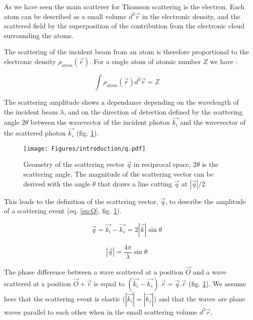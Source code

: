 As we have seen the main scatterer for Thomson scattering is the electron.
Each atom can be described as a small volume $d^3\vec{r}$ in the electronic density, and the scattered field by the superposition of the contribution from the electronic cloud surrounding the atoms.

The scattering of the incident beam from an atom is therefore proportional to the electronic density $\rho_{atom}(\vec{r})$.
For a single atom of atomic number $Z$ we have :

\begin{equation}
    \int \rho_{atom} (\vec{r}) d^3\vec{r} = Z
\end{equation}

The scattering amplitude shows a dependance depending on the wavelength of the incident beam $\lambda$, and on the direction of detection defined by the scattering angle $2\theta$ between the wavevector of the incident photon $\vec{k_i}$ and the wavevector of the scattered photon $\vec{k_s}$ (fig. \ref{fig:q}).

\begin{figure}[!htb]
    \centering
    \texttt{[image: Figures/introduction/q.pdf]}
    \caption{Geometry of the scattering vector $\vec{q}$ in reciprocal space, $2\theta$ is the scattering angle. The magnitude of the scattering vector can be derived with the angle $\theta$ that draws a line cutting $\vec{q}$ at $|\vec{q}|/2$.}
    \label{fig:q}
\end{figure}

This leads to the definition of the scattering vector, $\vec{q}$, to describe the amplitude of a scattering event (eq. \ref{eq:Q}, fig. \ref{fig:q}).

\begin{equation}
    \label{eq:Q}
    \vec{q}=\vec{k_i}-\vec{k_s}=2|\vec{k}|\sin{\theta}
\end{equation}

\begin{equation}
    \label{eq:QSinTheta}
    |\vec{q}| = \frac{4\pi}{\lambda} \sin{\theta}
\end{equation}

The phase difference between a wave scattered at a position $\vec{O}$ and a wave scattered at a position $\vec{O}+\vec{r}$ is equal to $(\vec{k_i} - \vec{k_s}).\vec{r} = \vec{q}.\vec{r}$ (fig. \ref{fig:q}).
We assume here that the scattering event is elastic ($|\vec{k_i}|=|\vec{k_s}|$) and that the waves are plane waves parallel to each other when in the small scattering volume $d^3\vec{r}$.

